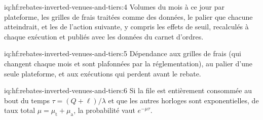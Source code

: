 \begin{solution}{iq:hf:rebates-inverted-venues-and-tiers:4}
Volumes du mois à ce jour par plateforme, les grilles de frais traitées comme des données, le palier que chacune atteindrait, et les  de l'action suivante, y compris les effets de seuil,
recalculés à chaque exécution et publiés avec les données du carnet d'ordres.
\end{solution}

\begin{solution}{iq:hf:rebates-inverted-venues-and-tiers:5}
Dépendance aux grilles de frais (qui changent chaque mois et sont plafonnées par la réglementation), au palier d'une seule plateforme, et aux exécutions qui perdent avant le rebate.
\end{solution}

\begin{solution}{iq:hf:rebates-inverted-venues-and-tiers:6}
Si la file est entièrement consommée au bout du temps $\tau=(Q+\ell)/\lambda$ et que les autres horloges sont exponentielles, de taux total $\mu=\mu_{\mathrm{t}}+\mu_{\mathrm{a}}$,
la probabilité vaut $e^{-\mu\tau}$.
\end{solution}
